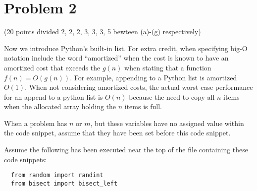 \documentclass{article}
\begin{document}
\section{Problem 2}

(20 points divided 2, 2, 2, 3, 3, 3, 5 bewteen (a)-(g) respectively)

Now we introduce Python's built-in list.  For extra credit, when
specifying big-O notation include the word ``amortized'' when the cost
is known to have an amortized cost that exceeds the $g(n)$ when
stating that a function $f(n) = O(g(n))$.  For example, appending to a
Python list is amortized $O(1)$.  When not considering amortized
costs, the actual worst case performance for an append to a python
list is $O(n)$ because the need to copy all $n$ items when the
allocated array holding the $n$ items is full.

When a problem has $n$ or $m$, but these variables have no assigned value
within the code snippet, assume that they have been set before this code
snippet.

Assume the following has been executed near the top of the file containing
these code snippets:

\begin{verbatim}
  from random import randint
  from bisect import bisect_left
\end{verbatim}
\end{document}
